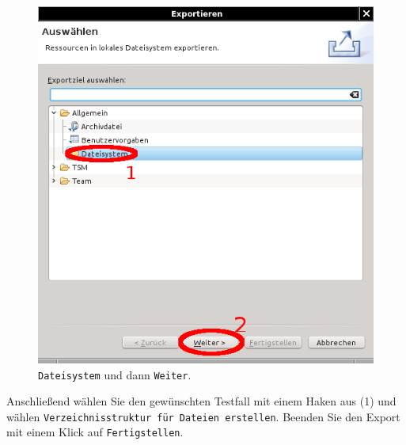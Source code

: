 \documentclass[11pt,a4paper,titlepage]{article}
\begin{document}
\begin{figure}[H]
 \centering
 \includegraphics{./ImportierenExportieren/assistent-exp1.png}
 \caption{\texttt{Dateisystem} und dann \texttt{Weiter}.}
 \label{abb:Assistent-exp1}
\end{figure}
\vspace{\baselineskip}
Anschließend wählen Sie den gewünschten Testfall mit einem Haken aus (1) und wählen \texttt{Verzeichnisstruktur für Dateien erstellen}. Beenden Sie den Export mit einem Klick auf \texttt{Fertigstellen}.
\end{document}
